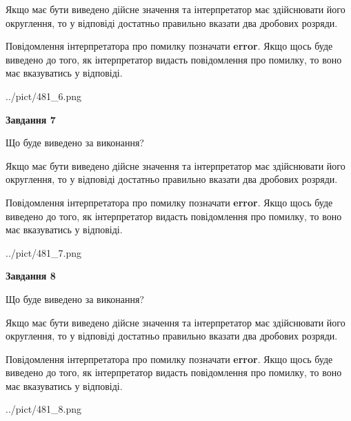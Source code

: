 \documentclass[12pt, ukrainian]{article}
\begin{document}
{\begin {Large}
Якщо має бути виведено дійсне значення та інтерпретатор має здійснювати його округлення, 
то у відповіді достатньо правильно вказати два дробових розряди.

Повідомлення інтерпретатора про помилку позначати \textbf{error}.
Якщо щось буде виведено до того, як інтерпретатор видасть повідомлення про помилку, 
то воно має вказуватись у відповіді. \par

\begin{center}
	{../pict/481_6.png}
\end{center}
\newpage

{\begin {center}\textbf{Завдання 7}\end {center}}\par
Що буде виведено за виконання? \par

Якщо має бути виведено дійсне значення та інтерпретатор має здійснювати його округлення, 
то у відповіді достатньо правильно вказати два дробових розряди.

Повідомлення інтерпретатора про помилку позначати \textbf{error}.
Якщо щось буде виведено до того, як інтерпретатор видасть повідомлення про помилку, 
то воно має вказуватись у відповіді. \par

\begin{center}
	{../pict/481_7.png}
\end{center}
\newpage

{\begin {center}\textbf{Завдання 8}\end {center}}\par
Що буде виведено за виконання? \par

Якщо має бути виведено дійсне значення та інтерпретатор має здійснювати його округлення, 
то у відповіді достатньо правильно вказати два дробових розряди.

Повідомлення інтерпретатора про помилку позначати \textbf{error}.
Якщо щось буде виведено до того, як інтерпретатор видасть повідомлення про помилку, 
то воно має вказуватись у відповіді. \par

\begin{center}
	{../pict/481_8.png}
\end{center}
\newpage


\end{Large}}
\end{document}
